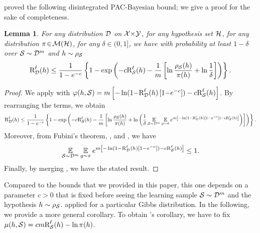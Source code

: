 \documentclass[twoside]{article}
\theoremstyle{plain}
\newtheorem{lemma}[theorem]{Lemma}
\begin{document}
\citet[Theorem 1.2.7]{catoni2007pac} proved the following disintegrated PAC-Bayesian bound; we give a proof for the sake of completeness.
\begin{lemma}\label{theorem:disintegrated-catoni}
For any distribution $\mathcal{D}$ on $\mathcal{X}{\times}\mathcal{Y}$, for any hypothesis set $\mathcal{H}$, for any distribution $\pi\!\in\!\mathcal{M}(\mathcal{H})$, for any $\delta\!\in\!(0, 1]$, we have with probability at least $1-\delta$ over $\mathcal{S}\sim\mathcal{D}^m$ and $h\sim\rho_{\mathcal{S}}$
\begin{align*}
\text{R}^{\ell}_{\mathcal{D}}(h) \le \frac{1}{1-e^{-c}}\left\{1-\exp\left( -c\text{R}^{\ell}_{\mathcal{S}}(h) - \frac{1}{m}\left[ \ln\frac{\rho_{\mathcal{S}}(h)}{\pi(h)} + \ln\frac{1}{\delta}\right]\right)\right\}.
\end{align*}
\end{lemma}
\begin{proof}
We apply  with $\varphi(h, \mathcal{S})= m\left[ -\ln(1{-}\text{R}^{\ell}_{\mathcal{D}}(h)\left[ 1{-}e^{-c}\right]) - c\text{R}^{\ell}_{\mathcal{S}}(h)\right]$.
By rearranging the terms, we obtain 
\begin{align}
\text{R}^{\ell}_{\mathcal{D}}(h) \le \frac{1}{1-e^{-c}}\left\{1-\exp\left( -c\text{R}^{\ell}_{\mathcal{S}}(h) - \frac{1}{m}\left[ \ln\frac{\rho_{\mathcal{S}}(h)}{\pi(h)} + \ln\left(\frac{1}{\delta}\operatorname*{\mathbb{E}}_{\mathcal{S}\sim\mathcal{D}^m}\operatorname*{\mathbb{E}}_{g\sim\pi}e^{m\left[ -\ln(1{-}\text{R}^{\ell}_{\mathcal{D}}(h)[1{-}e^{-c}])-c\text{R}^{\ell}_{\mathcal{S}}(h)\right]}\right)\right]\right)\right\}.\label{eq:proof-disintegrated-catoni-1}
\end{align}
Moreover, from Fubini's theorem, \citet[Lemma 3]{maurer2004note}, and \citet[Corollary 2.2]{germain2009pac}, we have 
\begin{align}
\operatorname*{\mathbb{E}}_{\mathcal{S}\sim\mathcal{D}^m}\operatorname*{\mathbb{E}}_{g\sim\pi}e^{m\left[ -\ln(1{-}\text{R}^{\ell}_{\mathcal{D}}(h)[1{-}e^{-c}]) - c\text{R}^{\ell}_{\mathcal{S}}(h)\right]} \le 1.\label{eq:proof-disintegrated-catoni-2}
\end{align}
Finally, by merging , we have the stated result.
\end{proof}
Compared to the bounds that we provided in this paper, this one depends on a parameter $c>0$ that is fixed before seeing the learning sample $\mathcal{S}\sim\mathcal{D}^m$ and the hypothesis $h\sim\rho_{\mathcal{S}}$. 
\citeauthor{catoni2007pac} applied  for a particular Gibbs distribution.
In the following, we provide a more general corollary.
To obtain \citeauthor{catoni2007pac}'s corollary, we have to fix $\operatorname{\mu}(h, \mathcal{S})=cm\text{R}^{\ell}_{\mathcal{S}}(h)-\ln\pi(h)$.
\end{document}
